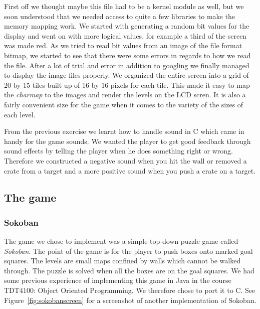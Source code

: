 \documentclass[a4paper,11pt]{article}
\begin{document}
First off we thought maybe this file had to be a kernel module as well, but we soon understood that we needed access to quite a few libraries to make the memory mapping work. We started with generating a random bit values for the display and went on with more logical values, for example a third of the screen was made red. As we tried to read bit values from an image of the file format bitmap, we started to see that there were some errors in regards to how we read the file. After a lot of trial and error in addition to googling we finally managed to display the image files properly. We organized the entire screen into a grid of 20 by 15 tiles built up of 16 by 16 pixels for each tile. This made it easy to map the \textit{charmap} to the images and render the levels on the LCD scren. It is also a fairly convenient size for the game when it comes to the variety of the sizes of each level.

From the previous exercise we learnt how to handle sound in C which came in handy for the game sounds. We wanted the player to get good feedback through sound effects by telling the player when he does something right or wrong. Therefore we constructed a negative sound when you hit the wall or removed a crate from a target and a more positive sound when you push a crate on a target. 

\subsection{The game}
\subsubsection{Sokoban}
The game we chose to implement was a simple top-down puzzle game called \textit{Sokoban}\cite{sokoban}. The point of the game is for the player to push boxes onto marked goal squares. The levels are small maps confined by walls which cannot be walked through. The puzzle is solved when all the boxes are on the goal squares. We had some previous experience of implementing this game in Java in the course TDT4100: Object Oriented Programming. We therefore chose to port it to C. See Figure~\ref{fig:sokobanscreen} for a screenshot of another implementation of Sokoban.
\end{document}
